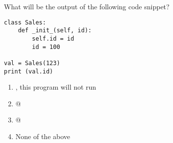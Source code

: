 \question
What will be the output of the following code snippet?

\begin{lstlisting}
class Sales:
    def _init_(self, id):
        self.id = id
        id = 100

val = Sales(123)
print (val.id)
\end{lstlisting}

\begin{enumerate}
\item \lstinline@SyntaxError@, this program will not run
\item {}@
\item {}@
\item None of the above
\end{enumerate}

